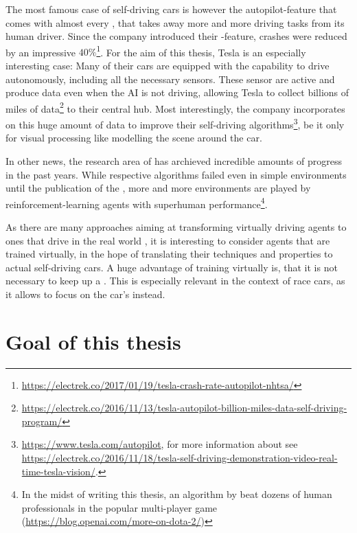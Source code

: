 The most famous case of self-driving cars is however the autopilot-feature that comes with almost every , that takes away more and more driving tasks from its human driver. Since the company introduced their -feature, crashes were reduced by an impressive $40\%$\footnote{\url{https://electrek.co/2017/01/19/tesla-crash-rate-autopilot-nhtsa/}}. For the aim of this thesis, Tesla is an especially interesting case: Many of their cars are equipped with the capability to drive autonomously, including all the necessary sensors. These sensor are active and produce data even when the AI is not driving, allowing Tesla to collect billions of miles of data\footnote{\url{https://electrek.co/2016/11/13/tesla-autopilot-billion-miles-data-self-driving-program/}} to their central hub. Most interestingly, the company incorporates  on this huge amount of data to improve their self-driving algorithms\footnote{\url{https://www.tesla.com/autopilot}, for more information about  see  \url{https://electrek.co/2016/11/18/tesla-self-driving-demonstration-video-real-time-tesla-vision/}.}, be it only for visual processing like modelling the scene around the car.

In other news, the research area of  has archieved incredible amounts of progress in the past years. While respective algorithms failed even in simple environments until the publication of the \cite{mnih_playing_2013}, more and more environments are played by reinforcement-learning agents with superhuman performance\footnote{In the midst of writing this thesis, an algorithm by  beat dozens of human professionals in the popular multi-player game  (\url{https://blog.openai.com/more-on-dota-2/})}. 

As there are many approaches aiming at transforming virtually driving agents to ones that drive in the real world \cite{you_virtual_2017}, it is interesting to consider agents that are trained virtually, in the hope of translating their techniques and properties to actual self-driving cars. A huge advantage of training virtually is, that it is not necessary to keep up a . This is especially relevant in the context of race cars, as it allows to focus on the car's  instead.

\section{Goal of this thesis}

